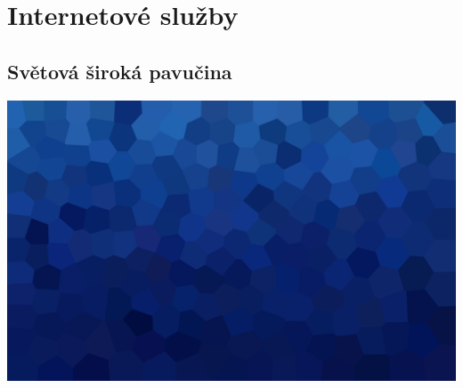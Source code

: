 \documentclass[aspectratio=169,xcolor=dvipsnames, t]{beamer}
\begin{document}
\section{Internetové služby}
\subsection{Světová široká pavučina}
{
    \includegraphics[width=\paperwidth,height=\paperheight]{AICStyleData/logos/mene_polygonu_bg.png}
}
\end{document}
